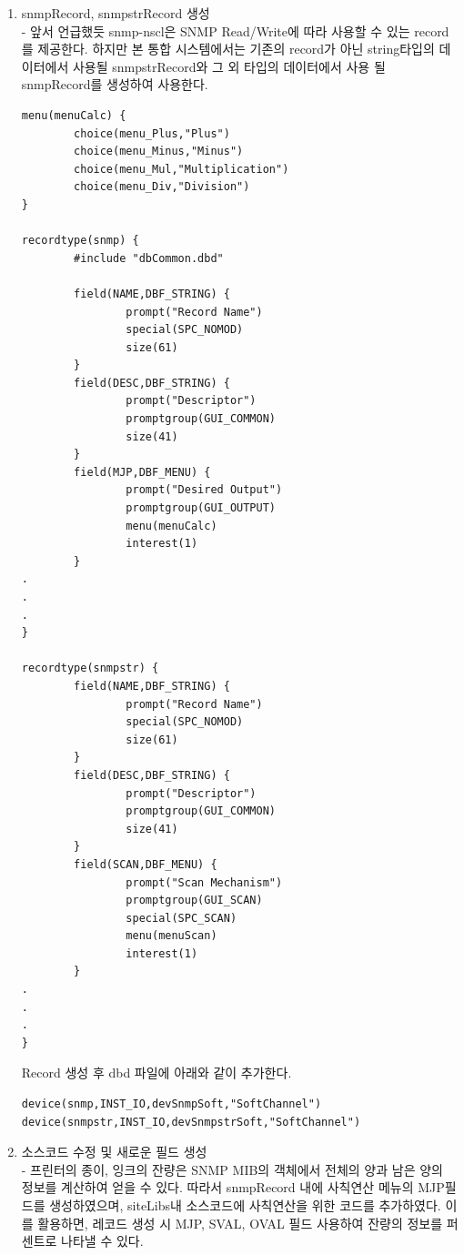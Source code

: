 \documentclass[11pt
  , a4paper
  , article
  , oneside
]{memoir}
\begin{document}
\begin{enumerate}
\item snmpRecord, snmpstrRecord 생성\\
- 앞서 언급했듯 snmp-nscl은 SNMP Read/Write에 따라 사용할 수 있는 record를 제공한다. 하지만 본 통합 시스템에서는 기존의 record가 아닌 string타입의 데이터에서 사용될 snmpstrRecord와 그 외 타입의 데이터에서 사용 될 snmpRecord를 생성하여 사용한다. 
 
\begin{lstlisting}[style=termstylenumber]
menu(menuCalc) {
        choice(menu_Plus,"Plus")
        choice(menu_Minus,"Minus")
        choice(menu_Mul,"Multiplication")
        choice(menu_Div,"Division")
}

recordtype(snmp) {
        #include "dbCommon.dbd" 

        field(NAME,DBF_STRING) {
                prompt("Record Name")
                special(SPC_NOMOD)
                size(61)
        }
        field(DESC,DBF_STRING) {
                prompt("Descriptor")
                promptgroup(GUI_COMMON)
                size(41)
        }
        field(MJP,DBF_MENU) {
                prompt("Desired Output")
                promptgroup(GUI_OUTPUT)
                menu(menuCalc)
                interest(1)
        }
.
.
.
}

recordtype(snmpstr) {
        field(NAME,DBF_STRING) {
                prompt("Record Name")
                special(SPC_NOMOD)
                size(61)
        }
        field(DESC,DBF_STRING) {
                prompt("Descriptor")
                promptgroup(GUI_COMMON)
                size(41)
        }
        field(SCAN,DBF_MENU) {
                prompt("Scan Mechanism")
                promptgroup(GUI_SCAN)
                special(SPC_SCAN)
                menu(menuScan)
                interest(1)
        }
.
.
.
}
\end{lstlisting}

Record 생성 후 dbd 파일에 아래와 같이 추가한다. 
\begin{lstlisting}[style=termstyle]
device(snmp,INST_IO,devSnmpSoft,"SoftChannel")
device(snmpstr,INST_IO,devSnmpstrSoft,"SoftChannel")
\end{lstlisting}

\item 소스코드 수정 및 새로운 필드 생성\\
- 프린터의 종이, 잉크의 잔량은 SNMP MIB의 객체에서 전체의 양과 남은 양의 정보를 계산하여 얻을 수 있다. 따라서 snmpRecord 내에 사칙연산 메뉴의 MJP필드를 생성하였으며, siteLibs내 소스코드에 사칙연산을 위한 코드를 추가하였다. 이를 활용하면, 레코드 생성 시 MJP, SVAL, OVAL 필드 사용하여 잔량의 정보를 퍼센트로 나타낼 수 있다.


\end{enumerate}
\end{document}

